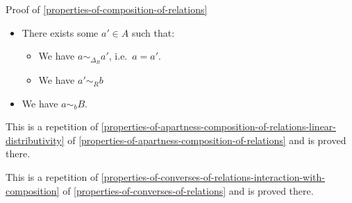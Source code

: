 \begin{Proof}{Proof of \cref{properties-of-composition-of-relations}}
\begin{itemize}
            \begin{itemize}
                \item There exists some $a'\in A$ such that:
                    \begin{itemize}
                        \item We have $a\sim_{\Delta_{B}}a'$, i.e.\ $a=a'$.
                        \item We have $a'\sim_{R}b$
                    \end{itemize}
                \item We have $a\sim_{b}B$.
            \end{itemize}
    \end{itemize}

    This is a repetition of \cref{properties-of-apartness-composition-of-relations-linear-distributivity} of \cref{properties-of-apartness-composition-of-relations} and is proved there.

    This is a repetition of \cref{properties-of-converses-of-relations-interaction-with-composition} of \cref{properties-of-converses-of-relations} and is proved there.


\end{Proof}
